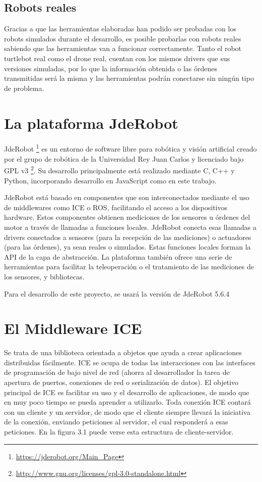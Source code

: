 \subsection{Robots reales}
Gracias a que las herramientas elaboradas han podido ser probadas con los robots simulados durante el desarrollo, es posible probarlas con robots reales sabiendo que las herramientas van a funcionar correctamente. Tanto el robot turtlebot real como el drone real, cuentan con los mismos drivers que sus versiones simuladas, por lo que la información obtenida o las órdenes transmitidas será la misma y las herramientas podrán conectarse sin ningún tipo de problema.

\section{La plataforma JdeRobot}
JdeRobot \footnote{\url{https://jderobot.org/Main_Page}} es un entorno de software libre para robótica y visión artificial creado por el grupo de robótica de la Universidad Rey Juan Carlos y licenciado bajo GPL v3 \footnote{\url{http://www.gnu.org/licenses/gpl-3.0-standalone.html}}. Su desarrollo principalmente está realizado mediante C, C++ y Python, incorporando desarrollo en JavaScript como en este trabajo.

JdeRobot está basado en componentes que son interconectados mediante el uso de middlewares como ICE o ROS, facilitando el acceso a los dispositivos hardware. Estos componentes obtienen mediciones  de los sensores u órdenes del motor a través de llamadas a funciones locales. JdeRobot conecta esas llamadas a drivers conectados a sensores (para la recepción de las mediciones) o actuadores (para las órdenes), ya sean reales o simulados. Estas funciones locales forman la API de la capa de abstracción. La plataforma también ofrece una serie de herramientas para facilitar la teleoperación o el tratamiento de las mediciones de los sensores, y bibliotecas.

Para el desarrollo de este proyecto, se usará la versión de JdeRobot 5.6.4

\section{El Middleware ICE}
Se trata de una biblioteca orientada a objetos que ayuda a crear aplicaciones distribuidas fácilmente. ICE se ocupa de todas las interacciones con las interfaces de programación de bajo nivel de red (ahorra al desarrollador la tarea de apertura de puertos, conexiones de red o serialización de datos). El objetivo principal de ICE es facilitar su uso y el desarrollo de aplicaciones, de modo que en muy poco tiempo se pueda aprender a utilizarlo. Toda conexión ICE contará con un cliente y un servidor, de modo que el cliente siempre llevará la iniciativa de la conexión, enviando peticiones al servidor, el cual responderá a esas peticiones. En la figura 3.1 puede verse esta estructura de cliente-servidor.

